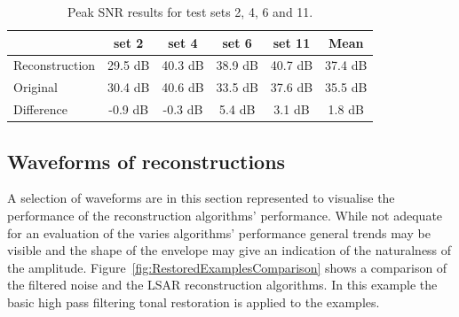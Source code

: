 \begin{table}\begin{center}
\caption{Peak SNR results for test sets 2, 4, 6 and 11.}
\label{tab:PeakSNR}
\begin{tabular}{|l|c|c|c|c|c|}\hline
                    & set 2     & set 4     & set 6     & set 11    & Mean      \\ \hline
  Reconstruction    & 29.5 dB   & 40.3 dB   & 38.9 dB   & 40.7 dB   & 37.4 dB   \\
  Original          & 30.4 dB   & 40.6 dB   & 33.5 dB   & 37.6 dB   & 35.5 dB   \\ \hline
  Difference        & -0.9 dB   & -0.3 dB   & 5.4  dB   & 3.1  dB   & 1.8  dB   \\
  \hline
\end{tabular}\end{center}\end{table}

\subsection{Waveforms of reconstructions}
A selection of waveforms are in this section represented to visualise the performance of the reconstruction algorithms' performance. While not adequate for an evaluation of the varies algorithms' performance general trends may be visible and the shape of the envelope may give an indication of the naturalness of the amplitude. Figure~\ref{fig:RestoredExamplesComparison} shows a comparison of the filtered noise and the LSAR reconstruction algorithms. In this example the basic high pass filtering tonal restoration is applied to the examples.

